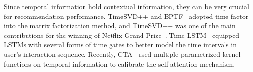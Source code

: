 


Since temporal information hold contextual information, they can be very crucial for recommendation performance. TimeSVD++ and BPTF~\cite{TIMESVD++, BPTF} adopted time factor into the matrix factorization method, and TimeSVD++ was one of the main contributions for the winning of Netflix Grand Prize~\cite{NETFLIXPRIZE}.
Time-LSTM~\cite{TIMELSTM} equipped LSTMs with several forms of time gates to better model the time intervals in user's interaction sequence. Recently, CTA~\cite{CTA} used multiple parametrized kernel functions on temporal information to calibrate the self-attention mechanism.